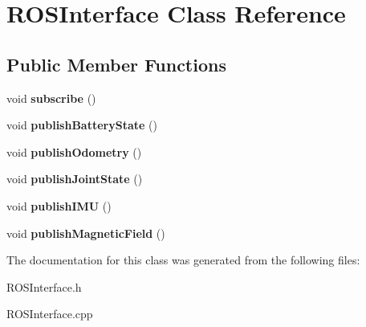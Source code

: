 \hypertarget{class_r_o_s_interface}{}\section{R\+O\+S\+Interface Class Reference}
\label{class_r_o_s_interface}
\subsection*{Public Member Functions}
\begin{DoxyCompactItemize}
\item 
\mbox{\label{class_r_o_s_interface_ab5d69e3646f227e9eea9c9ffbef3fe32}} 
void {\bfseries subscribe} ()
\item 
\mbox{\label{class_r_o_s_interface_a11b527195b243aa63f58a32175c66f6f}} 
void {\bfseries publish\+Battery\+State} ()
\item 
\mbox{\label{class_r_o_s_interface_a5c5ee7970a956d6f8839748fc58ba189}} 
void {\bfseries publish\+Odometry} ()
\item 
\mbox{\label{class_r_o_s_interface_a834f215c8126fafc84841b30398e720f}} 
void {\bfseries publish\+Joint\+State} ()
\item 
\mbox{\label{class_r_o_s_interface_ad94df75d8e58bf758f60e7eb2f68058a}} 
void {\bfseries publish\+I\+MU} ()
\item 
\mbox{\label{class_r_o_s_interface_af2ffdcd7a014a2780fab39a8ab62dc29}} 
void {\bfseries publish\+Magnetic\+Field} ()
\end{DoxyCompactItemize}


The documentation for this class was generated from the following files\+:\begin{DoxyCompactItemize}
\item 
R\+O\+S\+Interface.\+h\item 
R\+O\+S\+Interface.\+cpp\end{DoxyCompactItemize}

